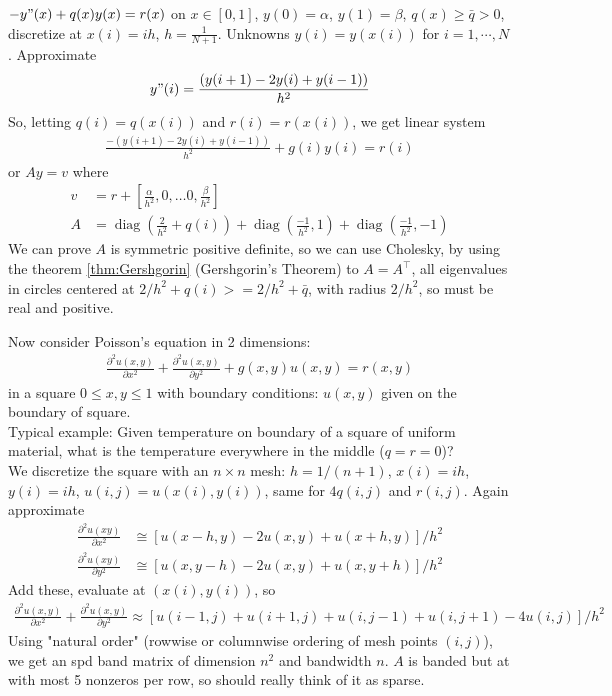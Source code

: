 \documentclass[11pt]{article}
\numberwithin{equation}{section}
\begin{document}
\begin{example}
    $ -y"(x) + q(x) y(x) = r(x)$ on $x \in[0,1]$, $y(0)=\alpha$, $y(1)=\beta$, $q(x) \geq \bar{q}>0$, discretize at $x(i)=ih$, $h = \frac{1}{N+1}$. 
    Unknowns $y(i)=y(x(i))$ for $i=1, \cdots, N$. Approximate \begin{align*}
        y"(i)= \frac{(y(i+1)-2 y(i)+y(i-1))}{h^2}
    \end{align*}
    So, letting $q(i)=q(x(i))$ and $r(i)=r(x(i))$, we get linear system \begin{align*}
        \frac{-(y(i+1)-2 y(i)+y(i-1))}{h^2}+g(i) y(i)=r(i)
    \end{align*} or $Ay=v$ where \begin{align*}
        v &= r+\left[\frac{\alpha}{h^{2}}, 0, \ldots 0, \frac{\beta}{h^{2}}\right] \\
        A &= \operatorname{diag}(\frac{2}{h^2} + q(i)) + \operatorname{diag}(\frac{-1}{h^2} ,1) + \operatorname{diag}(\frac{-1}{h^2} ,-1)
    \end{align*}
    We can prove $A$ is symmetric positive definite, so we can use Cholesky, by using the theorem \ref{thm:Gershgorin} (Gershgorin's Theorem) to $A=A^\top$,
    all eigenvalues in circles centered at $2/h^2 + q(i) >= 2/h^2 + \bar{q}$, with radius $2/h^2$, so must be real and positive.
\end{example}

\begin{example}
    Now consider Poisson's equation in 2 dimensions:\begin{align*}
        \frac{\partial^{2} u(x, y)}{\partial x^{2}}+\frac{\partial^{2} u(x, y)}{\partial y^{2}}+g(x, y) u(x, y)=r(x, y)
    \end{align*}
    in a square $0 \leq x,y \leq 1$ with boundary conditions: $u(x,y)$ given on the boundary of square.\\
    Typical example: Given temperature on boundary of a square of uniform material, what is the temperature everywhere in the middle ($q=r=0$)? \\
    We discretize the square with an $n\times n$ mesh: $h=1/(n+1)$, $x(i)=ih$, $y(i)=ih$, $u(i,j)=u(x(i), y(i))$, same for $4q(i,j)$ and $r(i,j)$.
    Again approximate \begin{align*}
        \frac{\partial^{2} {u}(x y)}{\partial x^{2}} &\cong[u(x-h, y)-2 u(x, y)+u(x+h, y)] / h^{2} \\
        \frac{\partial^{2} {u}(x y)}{\partial y^{2}} &\cong[u(x, y-h)-2 u(x, y)+u(x, y+h)] / h^{2}
    \end{align*}
    Add these, evaluate at $(x(i), y(i))$, so \begin{align*}
        \frac{\partial^{2} u(x, y)}{\partial x^{2}}+\frac{\partial^{2} u(x, y)}{\partial y^{2}} \approx \left[ u(i-1, j) + u(i+1, j) + u(i, j-1) + u(i, j+1) -4u(i,j) \right] / h^2
    \end{align*}
    Using "natural order" (rowwise or columnwise ordering of mesh points $(i,j)$), we get an spd band matrix of dimension $n^2$ and bandwidth $n$.
    $A$ is banded but at with most 5 nonzeros per row, so should really think of it as sparse.
\end{example}
\end{document}
